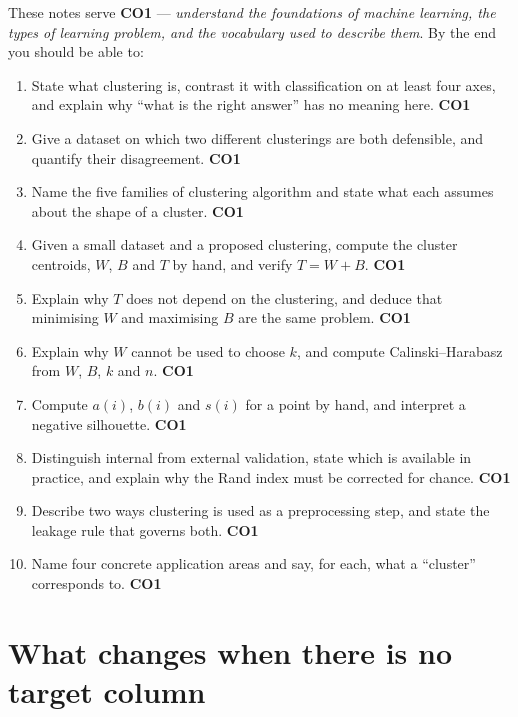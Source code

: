 \documentclass[11pt]{article}
\begin{document}
These notes serve \textbf{CO1} --- \emph{understand the foundations of machine
learning, the types of learning problem, and the vocabulary used to describe
them}. By the end you should be able to:

\begin{enumerate}[leftmargin=*]
  \item State what clustering is, contrast it with classification on at least
    four axes, and explain why ``what is the right answer'' has no meaning
    here. \hfill \textbf{CO1}
  \item Give a dataset on which two different clusterings are both
    defensible, and quantify their disagreement. \hfill \textbf{CO1}
  \item Name the five families of clustering algorithm and state what each
    assumes about the shape of a cluster. \hfill \textbf{CO1}
  \item Given a small dataset and a proposed clustering, compute the cluster
    centroids, $W$, $B$ and $T$ by hand, and verify $T = W + B$.
    \hfill \textbf{CO1}
  \item Explain why $T$ does not depend on the clustering, and deduce that
    minimising $W$ and maximising $B$ are the same problem. \hfill \textbf{CO1}
  \item Explain why $W$ cannot be used to choose $k$, and compute
    Calinski--Harabasz from $W$, $B$, $k$ and $n$. \hfill \textbf{CO1}
  \item Compute $a(i)$, $b(i)$ and $s(i)$ for a point by hand, and interpret a
    negative silhouette. \hfill \textbf{CO1}
  \item Distinguish internal from external validation, state which is
    available in practice, and explain why the Rand index must be corrected
    for chance. \hfill \textbf{CO1}
  \item Describe two ways clustering is used as a preprocessing step, and
    state the leakage rule that governs both. \hfill \textbf{CO1}
  \item Name four concrete application areas and say, for each, what a
    ``cluster'' corresponds to. \hfill \textbf{CO1}
\end{enumerate}

\section{What changes when there is no target column}
\label{sec:notarget}
\end{document}
